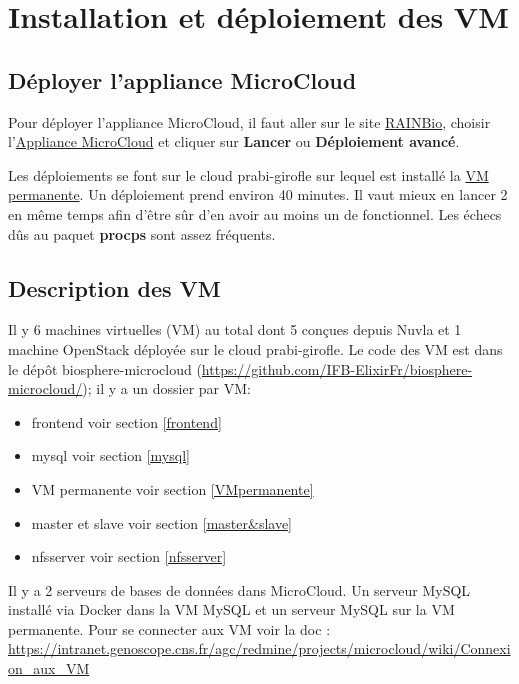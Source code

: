 \section {Installation et déploiement des VM}

\subsection{Déployer l'appliance MicroCloud}

Pour déployer l'appliance MicroCloud, il faut aller sur le site  \href{https://biosphere.france-bioinformatique.fr/catalogue/}{RAINBio}, choisir l’\href{https://biosphere.france-bioinformatique.fr/catalogue/appliance/150/}{Appliance MicroCloud} et cliquer sur \textbf{Lancer} ou \textbf{Déploiement avancé}.

Les déploiements se font sur le cloud prabi-girofle sur lequel est installé la \hyperref[VM permanente]{VM permanente}.
Un déploiement prend environ 40 minutes.
Il vaut mieux en lancer 2 en même temps afin d'être sûr d'en avoir au moins un de fonctionnel.
Les échecs dûs au paquet \textbf{procps} sont assez fréquents.

\subsection {Description des VM}

Il y 6 machines virtuelles (VM) au total dont 5 conçues depuis Nuvla et 1 machine OpenStack déployée sur le cloud prabi-girofle.
Le code des VM est dans le dépôt biosphere-microcloud (\url{https://github.com/IFB-ElixirFr/biosphere-microcloud/}); il y a un dossier par VM:

\begin{itemize}
	\item frontend voir section \ref{frontend}
	\item mysql voir section \ref{mysql}
	\item VM permanente voir section \ref{VMpermanente}
	\item master et slave voir section \ref{master&slave}
	\item nfsserver voir section \ref{nfsserver}
\end{itemize}

Il y a 2 serveurs de bases de données dans MicroCloud. Un serveur MySQL installé via Docker dans la VM MySQL et un serveur MySQL sur la VM permanente.
Pour se connecter aux VM voir la doc : \url{https://intranet.genoscope.cns.fr/agc/redmine/projects/microcloud/wiki/Connexion_aux_VM}

